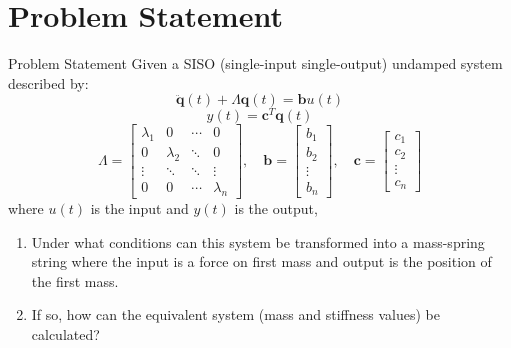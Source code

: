 \documentclass{beamer}
\begin{document}
\section{Problem Statement}
\begin{frame}{Problem Statement}
Given a SISO (single-input single-output) undamped system described by:
\begin{equation}
\ddot{\mathbf{q}}(t) + \Lambda\mathbf{q}(t) = \mathbf{b}u(t)
\label{eq:modal1}
\end{equation}
\begin{equation}
y(t) = \mathbf{c}^T \mathbf{q}(t)
\label{eq:modal2}
\end{equation}
$$
\Lambda = \begin{bmatrix}
\lambda_1  &  0 & \cdots & 0 \\
0 & \lambda_2  & \ddots & 0 \\
\vdots & \ddots & \ddots & \vdots \\
0 & 0 & \cdots & \lambda_n \end{bmatrix}
,\quad \mathbf{b} = \begin{bmatrix} b_1 \\ b_2 \\ \vdots \\ b_n \end{bmatrix}
,\quad \mathbf{c} = \begin{bmatrix} c_1 \\ c_2 \\ \vdots \\ c_n \end{bmatrix}
\label{eq:modal3}
$$
where $u(t)$ is the input and $y(t)$ is the output,
\begin{enumerate}
\item Under what conditions can this system be transformed into a mass-spring string where the input is a force on first mass and output is the position of the first mass.
\item If so, how can the equivalent system (mass and stiffness values) be calculated?
\end{enumerate}
\end{frame}
\end{document}
